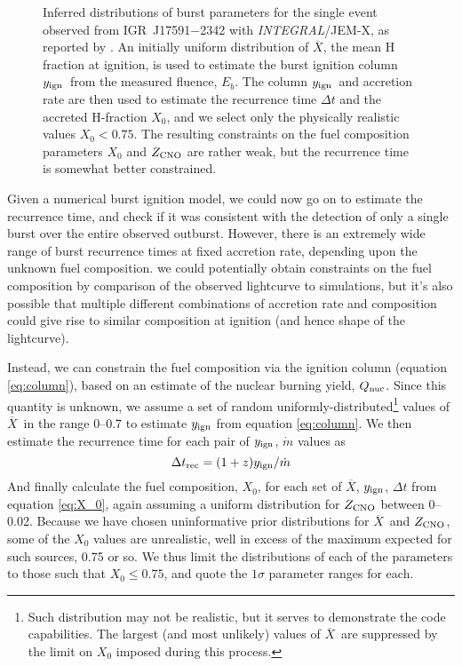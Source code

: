 \documentclass{aastex63}
\newcommand{\Xb}{\ensuremath{\overline{X}}}
\newcommand{\qnuc}{Q_{\rm nuc}}
\newcommand{\yign}{y_{\rm ign}}
\newcommand{\zcno}{Z_{\rm CNO}}
\newcommand{\igr}{{\it INTEGRAL}}
\begin{document}
\begin{figure}[ht!]
\caption{Inferred distributions of burst parameters for the single event observed from IGR~J17591$-$2342 with \igr/JEM-X, as reported by \cite{kuiper20}. An initially uniform distribution of \Xb, the mean H fraction at ignition, is used to estimate the burst ignition column $\yign$\ from the measured fluence, $E_b$. The column $\yign$\ and accretion rate are then used to estimate the recurrence time $\Delta t$ and the accreted H-fraction $X_0$, and we select only the physically realistic values $X_0<0.75$. The resulting constraints on the fuel composition parameters $X_0$ and $\zcno$ are rather weak, but the recurrence time is somewhat better constrained.
\label{fig:param_igr17591}}
\end{figure}


Given a numerical burst ignition model, we could now go on to estimate the recurrence time, and check if it was consistent with the detection of only a single burst over the entire observed outburst. However, there is an extremely wide range of burst recurrence times at fixed accretion rate, depending upon the unknown fuel composition. we could potentially obtain constraints on the fuel composition by comparison of the observed lightcurve to simulations, but it's also possible that multiple different combinations of accretion rate and composition could give rise to similar composition at ignition (and hence shape of the lightcurve).

Instead, we can constrain the fuel composition via the ignition column (equation \ref{eq:column}), based on an estimate of the nuclear burning yield, $\qnuc$. Since this quantity is unknown, we assume a set of random uniformly-distributed\footnote{Such distribution may not be realistic, but it serves to demonstrate the code capabilities. The largest (and most unlikely) values of \Xb\ are suppressed by the limit on $X_0$ imposed during this process.} values of \Xb\ in the range 0--0.7
to estimate $\yign$ from equation \ref{eq:column}.
%
We then estimate the recurrence time for each pair of $\yign$, $\dot{m}$ values as
\begin{equation}
\Delta t_{\rm rec} = (1+z)\yign/\dot{m}
\end{equation}
And finally calculate the fuel composition, $X_0$, for each set of \Xb, $\yign$, $\Delta t$ from equation \ref{eq:X_0}, again assuming a uniform distribution for $Z_{\rm CNO}$ between 0--0.02.
%
Because we have chosen uninformative prior distributions for \Xb\ and $Z_{\rm CNO}$, some of the $X_0$ values are unrealistic, well in excess of the maximum expected for such sources, 0.75 or so. We thus limit the distributions of each of the parameters to those such that $X_0\leq0.75$, and quote the $1\sigma$ parameter ranges for each.
\end{document}
